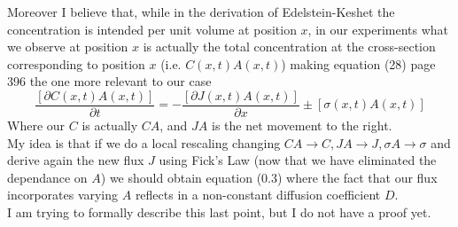 \documentclass{amsart}
\theoremstyle{plain}
\numberwithin{equation}{section}
\begin{document}
 Moreover I believe that, while in the derivation of Edelstein-Keshet the concentration is intended per unit volume at position $x$, in our experiments what we observe at position $x$ is actually the total concentration at the cross-section corresponding to position $x$ (i.e. $C(x,t)A(x,t)$) making equation (28) page 396 the one more relevant to our case
\begin{equation}
\frac{[\partial C(x,t)A(x,t)]}{\partial t}=-\frac{[\partial J(x,t)A(x,t)]}{\partial x}\pm[\sigma(x,t)A(x,t)]
\end{equation}
Where our $C$ is actually $CA$, and $JA$ is the net movement to the right.\\
My idea is that if we do a local rescaling changing $CA\rightarrow C,JA\rightarrow J,\sigma A\rightarrow \sigma$ and derive again the new flux $J$ using Fick's Law (now that we have eliminated the dependance on $A$) we should obtain equation (0.3) where the fact that our flux incorporates varying $A$ reflects in a non-constant diffusion coefficient $D$. \\
I am trying to formally describe this last point, but I do not have a proof yet.
 
\end{document}
